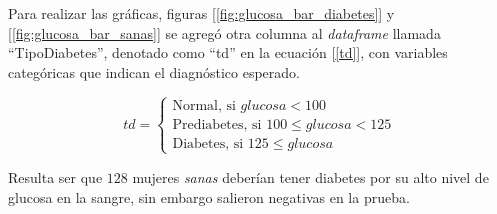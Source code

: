 \documentclass{article}
\begin{document}
Para realizar las gráficas, figuras [\ref{fig:glucosa_bar_diabetes}] y [\ref{fig:glucosa_bar_sanas}] se agregó otra columna al \emph{dataframe} llamada ``TipoDiabetes'', denotado como ``td'' en la ecuación [\ref{td}], con variables categóricas que indican el diagnóstico esperado.

\begin{equation}
	td=
	\begin{cases}
		\text{Normal, si      } glucosa < 100\\
		\text{Prediabetes, si   } 100 \leq glucosa < 125\\
		\text{Diabetes, si  } 125 \leq glucosa
	\end{cases}
\end{equation}

Resulta ser que $128$ mujeres \emph{sanas} deberían tener diabetes por su alto nivel de glucosa en la sangre, sin embargo salieron negativas en la prueba.





\onecolumn{
  
  
}
\end{document}
